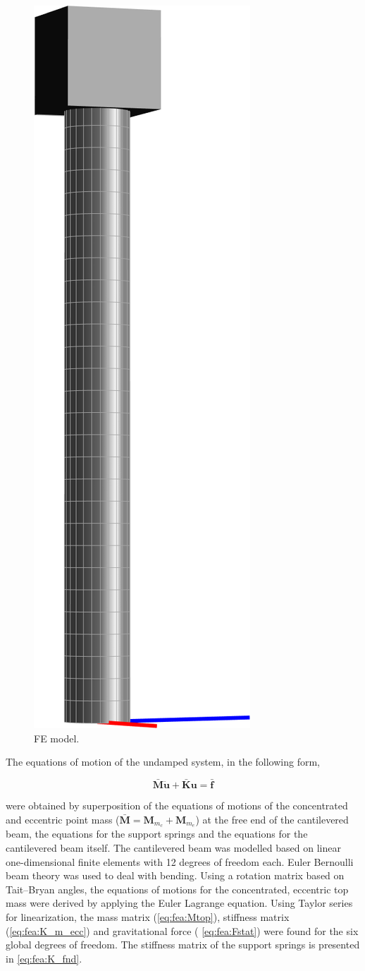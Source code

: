 \documentclass{article}
\begin{document}
\begin{figure}[ht]
    \centering
    \includegraphics[width=0.15\linewidth]{figures/FEModel.png}
    \caption{FE model.}
    \label{fig:fea:model}
\end{figure}

The equations of motion of the undamped system, in the following form,

\begin{equation}
    \mathbf{\bar{M}}\ddot{\mathbf{u}}+\mathbf{\bar{K}}\mathbf{u} = \mathbf{\bar{f}}
    \label{eq:fea:system}
\end{equation}

were obtained by superposition of the equations of motions of the concentrated and eccentric point mass ($ \mathbf{\bar{M}} = \mathbf{M}_{m_c} + \mathbf{M}_{m_e}$) at the free end of the cantilevered beam, the equations for the support springs and the equations for the cantilevered beam itself. The cantilevered beam was modelled based on linear one-dimensional finite elements with 12 degrees of freedom each. Euler Bernoulli beam theory was used to deal with bending. Using a rotation matrix based on Tait–Bryan angles, the equations of motions for the concentrated, eccentric top mass were derived by applying the Euler Lagrange equation. Using Taylor series for linearization, the mass matrix (\autoref{eq:fea:Mtop}), stiffness matrix (\autoref{eq:fea:K_m_ecc}) and gravitational force ( \autoref{eq:fea:Fstat}) were found for the six global degrees of freedom. The stiffness matrix of the support springs is presented in \autoref{eq:fea:K_fnd}. 
\end{document}

